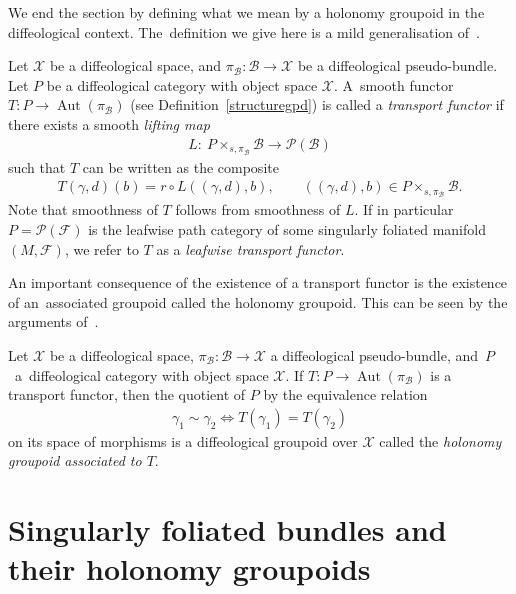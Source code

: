 \documentclass[10pt,a4paper]{amsart}
\numberwithin{equation}{section}
\def\Aut{\operatorname{Aut}}
\def\FF{{\mathcal{F}}}
\def\BB{{\mathcal{B}}}
\def\PP{{\mathcal{P}}}
\def\XX{{\mathcal{X}}}
\begin{document}
We end the section by defining what we mean by a holonomy groupoid in the diffeological context. The~definition we give here is a mild generalisation of~\cite[Definition~3.26]{mac3}.

\begin{Definition}
Let $\XX$ be a diffeological space, and $\pi_{\BB}\colon \BB\rightarrow \XX$ be a diffeological pseudo-bundle. Let $P$ be a diffeological category with object space $\XX$. A~smooth functor $T\colon P\rightarrow\Aut(\pi_{\BB})$ (see Definition~\ref{structuregpd}) is called a \textit{transport functor} if there exists a smooth \textit{lifting map}
\begin{gather*}
L\colon \ P\times_{s,\pi_{\BB}}\BB\rightarrow\PP(\BB)
\end{gather*}
such that $T$ can be written as the composite
\begin{gather*}
T(\gamma,d)(b) = r\circ L((\gamma,d),b),\qquad ((\gamma,d),b)\in P\times_{s,\pi_{\BB}}\BB.
\end{gather*}
Note that smoothness of $T$ follows from smoothness of $L$. If in particular $P = \PP(\FF)$ is the leafwise path category of some singularly foliated manifold $(M,\FF)$, we refer to $T$ as a \textit{leafwise transport functor}.
\end{Definition}

An important consequence of the existence of a transport functor is the existence of an~asso\-ciated groupoid called the holonomy groupoid. This can be seen by the arguments of~\cite[Pro\-position~3.27]{mac3}.

\begin{Definition}\label{holgpd}
Let $\XX$ be a diffeological space, $\pi_{\BB}\colon \BB\rightarrow \XX$ a diffeological pseudo-bundle, and~$P$~a~diffeological category with object space $\XX$. If $T\colon P\rightarrow\Aut(\pi_{\BB})$ is a transport functor, then the quotient of $P$ by the equivalence relation
\begin{gather*}
\gamma_{1}\sim\gamma_{2}\Leftrightarrow T(\gamma_{1})=T(\gamma_{2})
\end{gather*}
on its space of morphisms is a diffeological groupoid over $\XX$ called the \textit{holonomy groupoid associated to $T$}.
\end{Definition}

\section{Singularly foliated bundles and their holonomy groupoids}\label{sec4}
\end{document}
